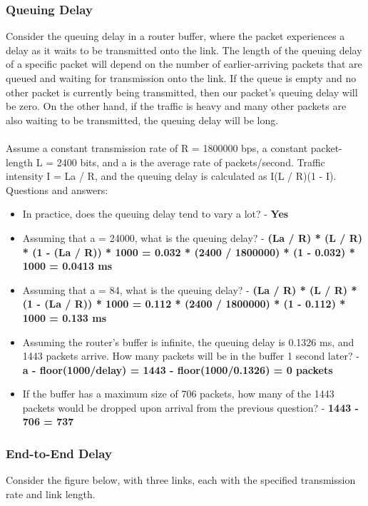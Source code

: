 \documentclass{article}
\begin{document}
\subsubsection{Queuing Delay}
Consider the queuing delay in a router buffer, where the packet experiences a delay as it waits to be transmitted onto the link. The length of the queuing delay of a specific packet will depend on the number of earlier-arriving packets that are queued and waiting for transmission onto the link. If the queue is empty and no other packet is currently being transmitted, then our packet’s queuing delay will be zero. On the other hand, if the traffic is heavy and many other packets are also waiting to be transmitted, the queuing delay will be long. \\ \\
Assume a constant transmission rate of R = 1800000 bps, a constant packet-length L = 2400 bits, and a is the average rate of packets/second. Traffic intensity I = La / R, and the queuing delay is calculated as I(L / R)(1 - I). \\

\noindent Questions and answers:

\begin{itemize}
	\item In practice, does the queuing delay tend to vary a lot? - \textbf{Yes}
	\item Assuming that a = 24000, what is the queuing delay? - \textbf{(La / R) * (L / R) * (1 - (La / R)) * 1000 = 0.032 * (2400 / 1800000) * (1 - 0.032) * 1000 = 0.0413 ms}
	\item Assuming that a = 84, what is the queuing delay? - \textbf{(La / R) * (L / R) * (1 - (La / R)) * 1000 = 0.112 * (2400 / 1800000) * (1 - 0.112) * 1000 = 0.133 ms}
	\item Assuming the router's buffer is infinite, the queuing delay is 0.1326 ms, and 1443 packets arrive. How many packets will be in the buffer 1 second later? - \textbf{a - floor(1000/delay) = 1443 - floor(1000/0.1326) = 0 packets}
	\item If the buffer has a maximum size of 706 packets, how many of the 1443 packets would be dropped upon arrival from the previous question? - \textbf{1443 - 706 = 737}
\end{itemize}

\subsubsection{End-to-End Delay}
Consider the figure below, with three links, each with the specified transmission rate and link length. \\
\end{document}
